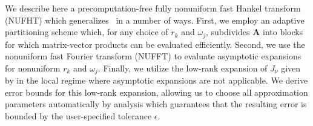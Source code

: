 We describe here a precomputation-free fully nonuniform fast Hankel transform
(NUFHT) which generalizes~\cite{townsend2015fast} in a number of ways. First, we
employ an adaptive partitioning scheme which, for any choice of $r_k$ and
$\omega_j$, subdivides $\bm{A}$ into blocks for which matrix-vector products can
be evaluated efficiently. Second, we use the nonuniform fast Fourier transform
(NUFFT) \citep{dutt1993fast, greengard2004accelerating} to evaluate asymptotic
expansions for nonuniform $r_k$ and $\omega_j$. Finally, we utilize the low-rank
expansion of $J_\nu$ given by \cite{wimp1962polynomial} in the local regime
where asymptotic expansions are not applicable. We derive error bounds for this
low-rank expansion, allowing us to choose all approximation parameters
automatically by analysis which guarantees that the resulting error is bounded
by the user-specified tolerance $\epsilon$. 

